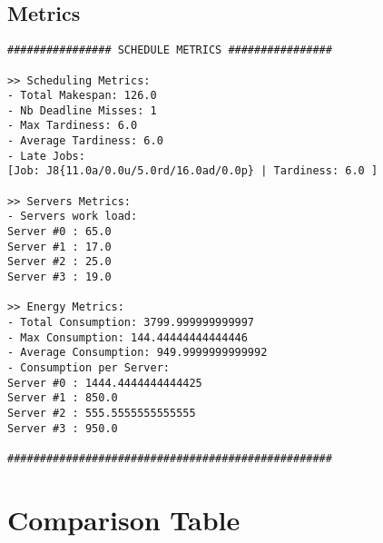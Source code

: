 \documentclass[./report.tex]{subfiles}
\begin{document}
\subsection{Metrics}
\begin{lstlisting}[style=txt, caption={Metrics for RMS on multiple servers}]
################ SCHEDULE METRICS ################

>> Scheduling Metrics: 
- Total Makespan: 126.0
- Nb Deadline Misses: 1
- Max Tardiness: 6.0
- Average Tardiness: 6.0
- Late Jobs: 
[Job: J8{11.0a/0.0u/5.0rd/16.0ad/0.0p} | Tardiness: 6.0 ]

>> Servers Metrics: 
- Servers work load:
Server #0 : 65.0
Server #1 : 17.0
Server #2 : 25.0
Server #3 : 19.0

>> Energy Metrics: 
- Total Consumption: 3799.999999999997
- Max Consumption: 144.44444444444446
- Average Consumption: 949.9999999999992
- Consumption per Server: 
Server #0 : 1444.4444444444425
Server #1 : 850.0
Server #2 : 555.5555555555555
Server #3 : 950.0

##################################################
\end{lstlisting}


\newpage
\section{Comparison Table}
\end{document}
